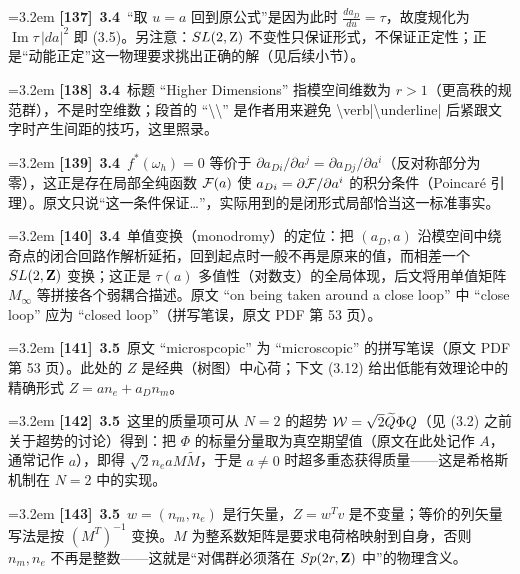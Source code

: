 \par
\par\medskip\noindent\hangindent=3.2em \textbf{[137]}~\textbf{3.4}~“取 $u=a$ 回到原公式”是因为此时 $\frac{da_D}{du}=\tau$，故度规化为 $\operatorname{Im}\tau\,|da|^2$ 即 (3.5)。另注意：$SL(2,{\rm Z})$ 不变性只保证形式，不保证正定性；正是“动能正定”这一物理要求挑出正确的解（见后续小节）。
\par
\par\medskip\noindent\hangindent=3.2em \textbf{[138]}~\textbf{3.4}~标题 “Higher Dimensions” 指模空间维数为 $r>1$（更高秩的规范群），不是时空维数；段首的 “\textbackslash{}{\textbackslash{}}” 是作者用来避免 \textbackslash{}verb|\textbackslash{}underline| 后紧跟文字时产生间距的技巧，这里照录。
\par
\par\medskip\noindent\hangindent=3.2em \textbf{[139]}~\textbf{3.4}~$f^*(\omega_h)=0$ 等价于 $\partial a_{Di}/\partial a^j=\partial a_{Dj}/\partial a^i$（反对称部分为零），这正是存在局部全纯函数 ${\cal F}(a)$ 使 $a_{Di}=\partial{\cal F}/\partial a^i$ 的积分条件（Poincaré 引理）。原文只说“这一条件保证…”，实际用到的是闭形式局部恰当这一标准事实。
\par
\par\medskip\noindent\hangindent=3.2em \textbf{[140]}~\textbf{3.4}~单值变换（monodromy）的定位：把 $(a_D,a)$ 沿模空间中绕奇点的闭合回路作解析延拓，回到起点时一般不再是原来的值，而相差一个 $SL(2,{\bf Z})$ 变换；这正是 $\tau(a)$ 多值性（对数支）的全局体现，后文将用单值矩阵 $M_\infty$ 等拼接各个弱耦合描述。原文 “on being taken around a close loop” 中 “close loop” 应为 “closed loop”（拼写笔误，原文 PDF 第 53 页）。
\par
\par\medskip\noindent\hangindent=3.2em \textbf{[141]}~\textbf{3.5}~原文 “microspcopic” 为 “microscopic” 的拼写笔误（原文 PDF 第 53 页）。此处的 $Z$ 是经典（树图）中心荷；下文 (3.12) 给出低能有效理论中的精确形式 $Z=a n_e+a_D n_m$。
\par
\par\medskip\noindent\hangindent=3.2em \textbf{[142]}~\textbf{3.5}~这里的质量项可从 $N=2$ 的超势 ${\cal W}=\sqrt{2}\widetilde Q\Phi Q$（见 (3.2) 之前关于超势的讨论）得到：把 $\Phi$ 的标量分量取为真空期望值（原文在此处记作 $A$，通常记作 $a$），即得 $\sqrt{2}n_e a M\widetilde M$，于是 $a\ne0$ 时超多重态获得质量——这是希格斯机制在 $N=2$ 中的实现。
\par
\par\medskip\noindent\hangindent=3.2em \textbf{[143]}~\textbf{3.5}~$w=(n_m,n_e)$ 是行矢量，$Z=w^Tv$ 是不变量；等价的列矢量写法是按 $(M^T)^{-1}$ 变换。$M$ 为整系数矩阵是要求电荷格映射到自身，否则 $n_m,n_e$ 不再是整数——这就是“对偶群必须落在 $Sp(2r,{\bf Z})$ 中”的物理含义。

